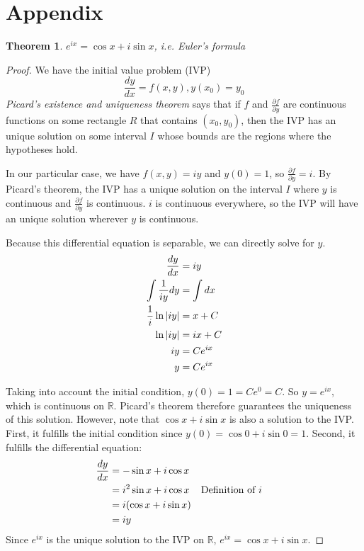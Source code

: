 \documentclass[11pt, oneside]{article}
\theoremstyle{plain}
\newtheorem{theorem}{Theorem}[section]
\theoremstyle{definition}
\begin{document}
\section{Appendix}
\begin{theorem}
  \( e^{ix} = \cos x + i \sin x \), i.e. Euler's formula 
\end{theorem}
\begin{proof}
  We have the initial value problem (IVP) 
\[ \frac{dy}{dx} = f(x, y), y(x_0) = y_0 \]
\textit{Picard's existence and uniqueness theorem} says that if \( f \) and
\( \frac{\partial f}{\partial y} \) are continuous functions on some rectangle
\( R \) that contains \( (x_0, y_0) \), then the IVP has an unique solution
on some interval \( I \) whose bounds are the regions where the hypotheses hold.

In our particular case, we have \( f(x, y) = iy \) and \( y(0) = 1 \),
so \( \frac{\partial f}{\partial y} = i \). By Picard's theorem, the IVP has a 
unique solution on the interval \( I \) where \( y \) is continuous and
\( \frac{\partial f}{\partial y} \) is continuous. \( i \) is continuous
everywhere, so the IVP will have an unique solution
wherever \( y \) is continuous.

Because this differential equation is separable, we can directly solve
for \( y \).
\begin{align*}
  \frac{dy}{dx} &= iy \\
  \int \frac{1}{iy} dy &= \int dx \\
  \frac{1}{i} \ln{\abs{iy}} &= x + C \\
  \ln{\abs{iy}} &= ix + C \\
  iy &= Ce^{ix} \\
  y &= Ce^{ix} \\
\end{align*}

Taking into account the initial condition, \( y(0) = 1 = Ce^0 = C \).
So \( y = e^{ix} \), which is continuous on \( \mathbb{R} \).
Picard's theorem therefore guarantees the uniqueness of this solution.
However, note that \( \cos x + i \sin x \) is also a solution to the IVP.
First, it fulfills the initial condition since
\( y(0) = \cos 0 + i \sin 0 = 1 \).
Second, it fulfills the differential equation:
\begin{align*}
  \frac{dy}{dx} &= -\sin x + i \cos x \\
                &= i^2 \sin x + i \cos x && \text{Definition of \( i \)} \\
                &= i(\cos x + i \sin x) \\
                &= iy
\end{align*}
Since \( e^{ix} \) is the unique solution to the IVP on \( \mathbb{R} \),
\( e^{ix} = \cos x + i \sin x \).
\end{proof}
\end{document}
